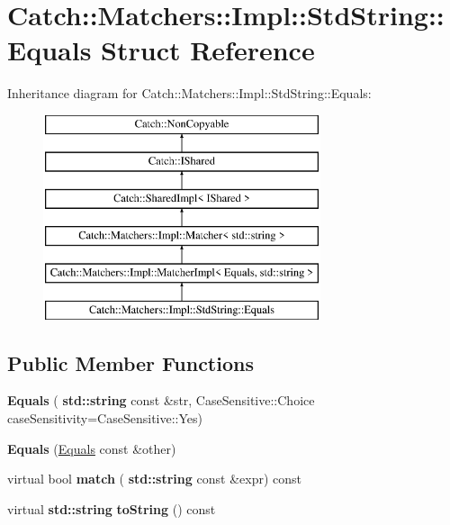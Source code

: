 \hypertarget{struct_catch_1_1_matchers_1_1_impl_1_1_std_string_1_1_equals}{}\section{Catch\+:\+:Matchers\+:\+:Impl\+:\+:Std\+String\+:\+:Equals Struct Reference}
\label{struct_catch_1_1_matchers_1_1_impl_1_1_std_string_1_1_equals}
Inheritance diagram for Catch\+:\+:Matchers\+:\+:Impl\+:\+:Std\+String\+:\+:Equals\+:\begin{figure}[H]
\begin{center}
\leavevmode
\includegraphics[height=6.000000cm]{struct_catch_1_1_matchers_1_1_impl_1_1_std_string_1_1_equals}
\end{center}
\end{figure}
\subsection*{Public Member Functions}
\begin{DoxyCompactItemize}
\item 
\mbox{\label{struct_catch_1_1_matchers_1_1_impl_1_1_std_string_1_1_equals_a5921d5ed75320fb64a678e3f1292a464}} 
{\bfseries Equals} (\textbf{ std\+::string} const \&str, Case\+Sensitive\+::\+Choice case\+Sensitivity=Case\+Sensitive\+::\+Yes)
\item 
\mbox{\label{struct_catch_1_1_matchers_1_1_impl_1_1_std_string_1_1_equals_acaa97de06aedf363ae803d65a975f5e4}} 
{\bfseries Equals} (\hyperlink{struct_catch_1_1_matchers_1_1_impl_1_1_std_string_1_1_equals}{Equals} const \&other)
\item 
\mbox{\label{struct_catch_1_1_matchers_1_1_impl_1_1_std_string_1_1_equals_abf0a94b4e66dbd586268d9983f867e68}} 
virtual bool {\bfseries match} (\textbf{ std\+::string} const \&expr) const
\item 
\mbox{\label{struct_catch_1_1_matchers_1_1_impl_1_1_std_string_1_1_equals_ab0d73961b95d9836d77b9e2e94c3790b}} 
virtual \textbf{ std\+::string} {\bfseries to\+String} () const
\end{DoxyCompactItemize}
